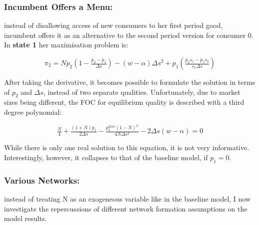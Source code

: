 \documentclass{article}
\numberwithin{figure}{section}
\numberwithin{table}{section}
\theoremstyle{indented}
\numberwithin{equation}{section} %
\begin{document}
\subsubsection{Incumbent Offers a Menu:}

instead of disallowing access of new consumers to her first period good, incumbent offers it as an alternative to the second period version for consumer 0. In \textbf{state 1} her maximisation problem is:

$$\pi_2 = Np_2(1-\tfrac{p_2-p_1}{\Delta s}) - (w-\alpha)\Delta s^2 + p_1(\tfrac{p_2s_1-p_1s_2}{s_1\Delta s})$$

After taking the derivative, it becomes possible to formulate the solution in terms of $p_2$ and $\Delta s$, instead of two separate qualities. Unfortunately, due to market sizes being different, the FOC for equilibrium quality is described with a third degree polynomial:

$$\tfrac{N}{4} + \tfrac{(1+N)p_1}{2\Delta s} - \tfrac{p_1^{2inc}(1-N)^2}{4N\Delta s^2} - 2 \Delta s (w-\alpha)=0$$

While there is only one real solution to this equation, it is not very informative. Interestingly, however, it collapses to that of the baseline model, if $p_1 = 0$. 


\subsubsection{Various Networks:} instead of treating N as an exogeneous variable like in the baseline model, I now investigate the repercussions of different network formation assumptions on the model results.
\end{document}
